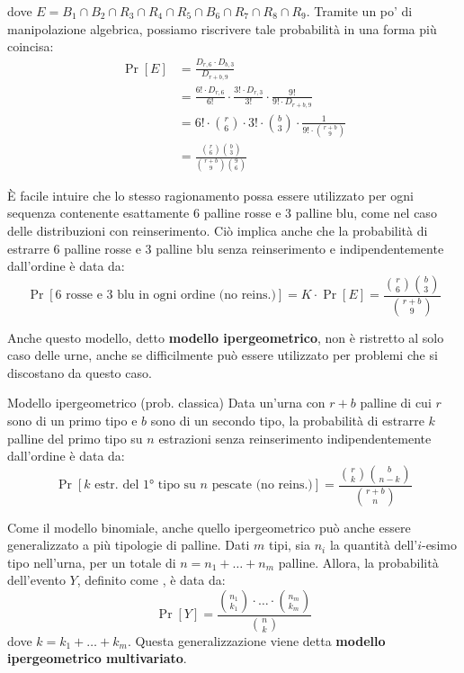 \documentclass[a4paper, 12pt]{report}
\begin{document}
    dove $E = B_1 \cap B_2 \cap R_3 \cap R_4 \cap R_5 \cap B_6 \cap R_7 \cap R_8 \cap R_9$. Tramite un po' di manipolazione algebrica, possiamo riscrivere tale probabilità in una forma più coincisa:
    \[\begin{split}
        \Pr[E] &= \frac{D_{r,6} \cdot D_{b,3}}{D_{r+b,9}} \\
        &= \frac{6! \cdot D_{r,6}}{6!} \cdot \frac{3! \cdot D_{r,3}}{3!} \cdot \frac{9!}{9! \cdot D_{r+b,9}} \\
        &= 6! \cdot \binom{r}{6} \cdot 3! \cdot \binom{b}{3} \cdot \frac{1}{9! \cdot \binom{r+b}{9}} \\
        &= \displaystyle \frac{\binom{r}{6} \binom{b}{3}}{\binom{r+b}{9} \binom{9}{6}}
    \end{split}\]

    È facile intuire che lo stesso ragionamento possa essere utilizzato per ogni sequenza contenente esattamente 6 palline rosse e 3 palline blu, come nel caso delle distribuzioni con reinserimento. Ciò implica anche che la probabilità di estrarre 6 palline rosse e 3 palline blu senza reinserimento e indipendentemente dall'ordine è data da:
    \[\Pr[\text{$6$ rosse e $3$ blu in ogni ordine (no reins.)}] = K \cdot \Pr[E] = \dfrac{\binom{r}{6} \binom{b}{3}}{\binom{r+b}{9}}\]

    Anche questo modello, detto \textbf{modello ipergeometrico}, non è ristretto al solo caso delle urne, anche se difficilmente può essere utilizzato per problemi che si discostano da questo caso. 
    
    \begin{frameddefn}{Modello ipergeometrico (prob. classica)}
        Data un'urna con $r+b$ palline di cui $r$ sono di un primo tipo e $b$ sono di un secondo tipo, la probabilità di estrarre $k$ palline del primo tipo su $n$ estrazioni senza reinserimento indipendentemente dall'ordine è data da:
        \[\Pr[\text{$k$ estr. del 1° tipo su $n$ pescate (no reins.)}] = \dfrac{\binom{r}{k} \binom{b}{n-k}}{\binom{r+b}{n}}\]
    \end{frameddefn}

    Come il modello binomiale, anche quello ipergeometrico può anche essere generalizzato a più tipologie di palline. Dati $m$ tipi, sia $n_i$ la quantità dell'$i$-esimo tipo nell'urna, per un totale di $n = n_1 + \ldots + n_m$ palline. Allora, la probabilità dell'evento $Y$, definito come , è data da:
    \[\displaystyle \Pr[Y] = \dfrac{\binom{n_1}{k_1} \cdot \ldots \cdot \binom{n_m}{k_m}}{\binom{n}{k}}\]
    dove $k = k_1 + \ldots + k_m$. Questa generalizzazione viene detta \textbf{modello ipergeometrico multivariato}.
\end{document}
